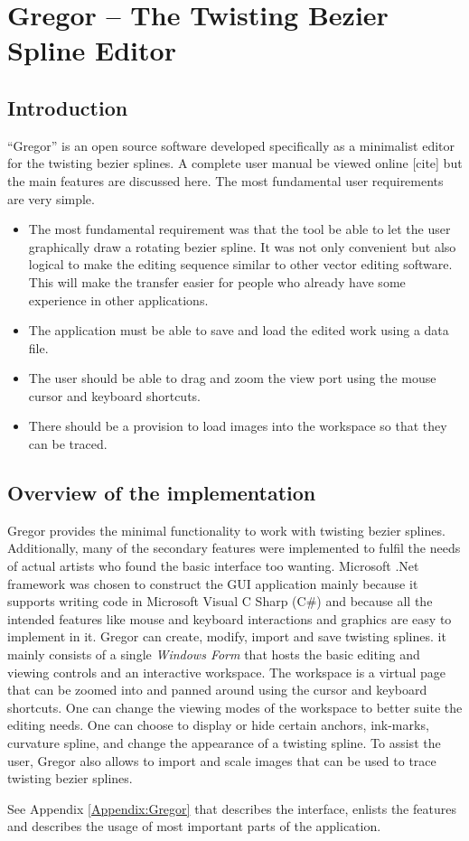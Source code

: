 \appendix
\section{Gregor -- The Twisting Bezier Spline Editor}\label{Chapter:Gregor}
\subsection{Introduction}
{
    ``Gregor'' is an open source software developed specifically as a minimalist editor for the twisting bezier splines. A complete user manual be viewed online [cite] but the main features are discussed here. The most fundamental user requirements are very simple.
    \begin{itemize}
      \item
      {
        The most fundamental requirement was that the tool be able to let the user graphically draw a rotating bezier spline. It was not only convenient but also logical to make the editing sequence similar to other vector editing software. This will make the transfer easier for people who already have some experience in other applications.
      }
      \item
      {
        The application must be able to save and load the edited work using a data file.
      }
      \item
      {
        The user should be able to drag and zoom the view port using the mouse cursor and keyboard shortcuts.
      }
      \item
      {
        There should be a provision to load images into the workspace so that they can be traced.
      }
    \end{itemize}
}
\subsection{Overview of the implementation}
{
    Gregor provides the minimal functionality to work with twisting bezier splines. Additionally, many of the secondary features were implemented to fulfil the needs of actual artists who found the basic interface too wanting. Microsoft .Net framework was chosen to construct the GUI application mainly because it supports writing code in Microsoft Visual C Sharp (C\#) and because all the intended features like mouse and keyboard interactions and graphics are easy to implement in it. Gregor can create, modify, import and save twisting splines. it mainly consists of a single \emph{Windows Form} that hosts the basic editing and viewing controls and an interactive workspace. The workspace is a virtual page that can be zoomed into and panned around using the cursor and keyboard shortcuts. One can change the viewing modes of the workspace to better suite the editing needs. One can choose to display or hide certain anchors, ink-marks, curvature spline, and change the appearance of a twisting spline. To assist the user, Gregor also allows to import and scale images that can be used to trace twisting bezier splines.

    See Appendix \ref{Appendix:Gregor} that describes the interface, enlists the features and describes the usage of most important parts of the application.
}
